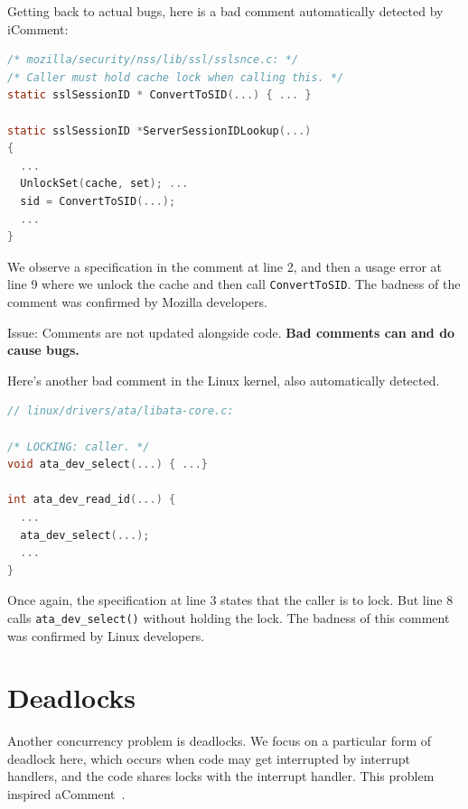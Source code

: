 \documentclass[11pt]{article}
\begin{document}
Getting back to actual bugs, here is a bad comment automatically detected by iComment:
\begin{lstlisting}[language=C]
/* mozilla/security/nss/lib/ssl/sslsnce.c: */
/* Caller must hold cache lock when calling this. */
static sslSessionID * ConvertToSID(...) { ... }

static sslSessionID *ServerSessionIDLookup(...)
{
  ...
  UnlockSet(cache, set); ...
  sid = ConvertToSID(...);
  ...
}
\end{lstlisting}
We observe a specification in the comment at line 2, and then a usage error at line 9 where we unlock the cache
and then call {\tt ConvertToSID}. The badness of the comment was confirmed by Mozilla developers.

Issue: Comments are not updated alongside code. {\bf Bad comments can and do cause bugs.}

Here's another bad comment in the Linux kernel, also automatically detected.
\begin{lstlisting}[language=C]
// linux/drivers/ata/libata-core.c:
      
/* LOCKING: caller. */
void ata_dev_select(...) { ...}

int ata_dev_read_id(...) {
  ...
  ata_dev_select(...);
  ...
}
\end{lstlisting}
Once again, the specification at line 3 states that the caller is to lock. But line 8 calls {\tt ata\_dev\_select()}
without holding the lock. The badness of this comment was confirmed by Linux developers.

\section*{Deadlocks}
Another concurrency problem is deadlocks. We focus on a particular form of deadlock here, which occurs when code
may get interrupted by interrupt handlers, and the code shares locks with the interrupt handler. This problem inspired
aComment~\cite{TanZhouPadioleau11AcommentMiningAnnotationsFromCommentsCode}.
\end{document}
